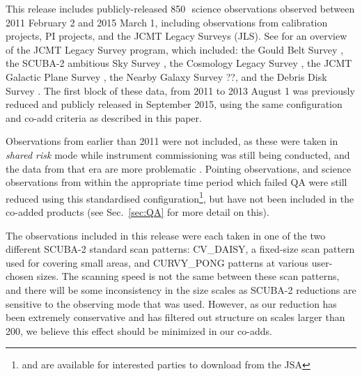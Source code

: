 \documentclass[twocolumn,times]{aastex6}
\newcommand{\um}{\micron}
\newcommand{\sref}[1]{Sec.~\ref{#1}}
\newcommand{\note}[1]{\textcolor{red}{Note: #1}}
\begin{document}
This release includes publicly-released 850\,\um\ science observations
observed between 2011 February 2 and 2015 March 1, including
observations from calibration projects, PI projects, and the JCMT
Legacy Surveys (JLS). See \citealt{ChrysostomouJLS} for an overview of the
JCMT Legacy Survey program, which included: the Gould Belt Survey
\citep{GBS}, the SCUBA-2 ambitious Sky Survey \citep{SASSy}, the
Cosmology Legacy Survey \citep{Geach2013}, the JCMT Galactic Plane Survey
\citep{JPS}, the Nearby Galaxy Survey ??, and the Debris Disk Survey
\citep{SONS}.  The first block of these data, from 2011 to 2013 August 1
was previously reduced and publicly released in September 2015,
using the same configuration and co-add criteria as described in this
paper.


Observations from earlier than 2011 were not included, as these were
taken in \emph{shared risk} mode while instrument commissioning was
still being conducted, and the data from that era are more problematic
\citep{SC19,Dempsey2010}. Pointing observations, and science
observations from within the appropriate time period which failed QA
were still reduced using this standardised configuration\footnote{and
  are available for interested parties to download from the JSA}, but
have not been included in the co-added products (see \sref{sec:QA} for
more detail on this).

The observations included in this release were each taken in one of
the two different SCUBA-2 standard scan patterns: CV\_DAISY, a
fixed-size scan pattern used for covering small areas, and CURVY\_PONG
patterns at various user-chosen sizes. The scanning speed is not the
same between these scan patterns, and there will be some inconsistency
in the size scales as SCUBA-2 reductions are sensitive to the
observing mode that was used. However, as our reduction has been
extremely conservative and has filtered out structure on scales larger
than 200\arcsec, we believe this effect should be minimized in our
co-adds.
\end{document}
